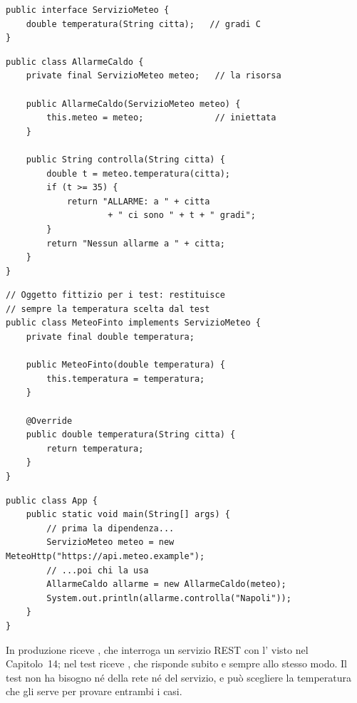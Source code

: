 \noindent\begin{minipage}[t]{0.49\textwidth}
\begin{lstlisting}[style=java, name=ServizioMeteo.java]
public interface ServizioMeteo {
    double temperatura(String citta);   // gradi C
}
\end{lstlisting}
\begin{lstlisting}[style=java, name=AllarmeCaldo.java]
public class AllarmeCaldo {
    private final ServizioMeteo meteo;   // la risorsa

    public AllarmeCaldo(ServizioMeteo meteo) {
        this.meteo = meteo;              // iniettata
    }

    public String controlla(String citta) {
        double t = meteo.temperatura(citta);
        if (t >= 35) {
            return "ALLARME: a " + citta
                    + " ci sono " + t + " gradi";
        }
        return "Nessun allarme a " + citta;
    }
}
\end{lstlisting}
\end{minipage}\hfill
\begin{minipage}[t]{0.49\textwidth}
\begin{lstlisting}[style=java, name=MeteoFinto.java]
// Oggetto fittizio per i test: restituisce
// sempre la temperatura scelta dal test
public class MeteoFinto implements ServizioMeteo {
    private final double temperatura;

    public MeteoFinto(double temperatura) {
        this.temperatura = temperatura;
    }

    @Override
    public double temperatura(String citta) {
        return temperatura;
    }
}
\end{lstlisting}
\end{minipage}
\begin{lstlisting}[style=java, name=App.java]
public class App {
    public static void main(String[] args) {
        // prima la dipendenza...
        ServizioMeteo meteo = new MeteoHttp("https://api.meteo.example");
        // ...poi chi la usa
        AllarmeCaldo allarme = new AllarmeCaldo(meteo);
        System.out.println(allarme.controlla("Napoli"));
    }
}
\end{lstlisting}

In produzione  riceve , che interroga un servizio REST con l' visto nel
Capitolo~14; nel test riceve , che risponde subito e sempre allo stesso modo. Il test non ha bisogno né
della rete né del servizio, e può scegliere la temperatura che gli serve per provare entrambi i casi.

